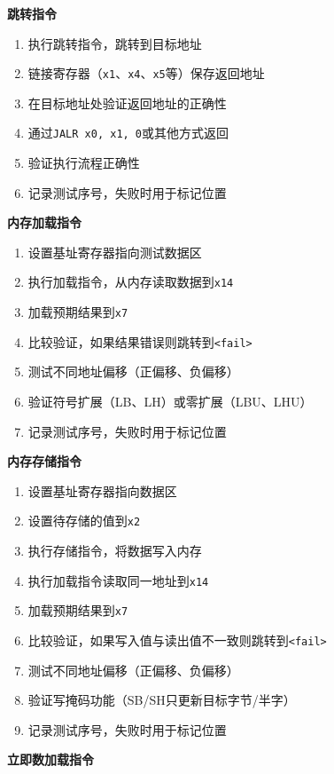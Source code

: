 \documentclass[12pt,a4paper]{ctexart}
\newcommand{\code}[1]{\texttt{#1}}
\begin{document}
\textbf{跳转指令}

\begin{enumerate}
    \item 执行跳转指令，跳转到目标地址
    \item 链接寄存器（\code{x1}、\code{x4}、\code{x5}等）保存返回地址
    \item 在目标地址处验证返回地址的正确性
    \item 通过\code{JALR x0, x1, 0}或其他方式返回
    \item 验证执行流程正确性
    \item 记录测试序号，失败时用于标记位置
\end{enumerate}

\textbf{内存加载指令}

\begin{enumerate}
    \item 设置基址寄存器指向测试数据区
    \item 执行加载指令，从内存读取数据到\code{x14}
    \item 加载预期结果到\code{x7}
    \item 比较验证，如果结果错误则跳转到\code{<fail>}
    \item 测试不同地址偏移（正偏移、负偏移）
    \item 验证符号扩展（LB、LH）或零扩展（LBU、LHU）
    \item 记录测试序号，失败时用于标记位置
\end{enumerate}

\textbf{内存存储指令}

\begin{enumerate}
    \item 设置基址寄存器指向数据区
    \item 设置待存储的值到\code{x2}
    \item 执行存储指令，将数据写入内存
    \item 执行加载指令读取同一地址到\code{x14}
    \item 加载预期结果到\code{x7}
    \item 比较验证，如果写入值与读出值不一致则跳转到\code{<fail>}
    \item 测试不同地址偏移（正偏移、负偏移）
    \item 验证写掩码功能（SB/SH只更新目标字节/半字）
    \item 记录测试序号，失败时用于标记位置
\end{enumerate}

\textbf{立即数加载指令}
\end{document}
